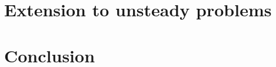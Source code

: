 \documentclass[aspectratio=169]{beamer}
\begin{document}



\section{Extension to unsteady problems}
\subsection{}


%

\section{Conclusion}
\subsection{}





% 
% 
\end{document}

